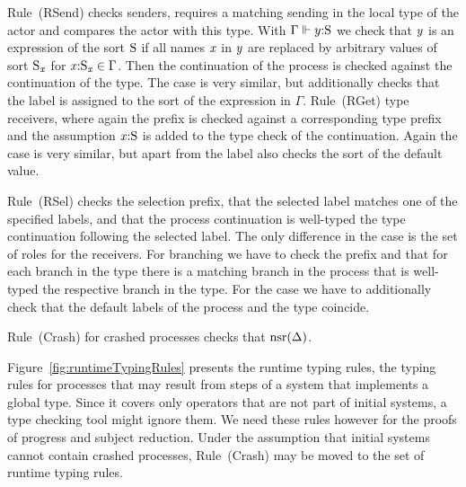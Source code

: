Rule~(\textsf{RSend}) checks \strongR senders, \ie requires a matching \strongR sending in the local type of the actor and compares the actor with this type.
With $ \Gamma \Vdash \Typed{\Expr[y]}{\Sort} $ we check that $ \Expr[y] $ is an expression of the sort $ \Sort $ if all names $ \Args $ in $ \Expr[y] $ are replaced by arbitrary values of sort $ \Sort_{\Args} $ for $ \Typed{\Args}{\Sort_{\Args}} \in \Gamma $.
Then the continuation of the process is checked against the continuation of the type.
The \unrel case is very similar, but additionally checks that the label is assigned to the sort of the expression in $ \Gamma $.
Rule~(\textsf{RGet}) type \strongR receivers, where again the prefix is checked against a corresponding type prefix and the assumption $ \Typed{\Args}{\Sort} $ is added to the type check of the continuation.
Again the \unrel case is very similar, but apart from the label also checks the sort of the default value.

Rule~(\textsf{RSel}) checks the \strongR selection prefix, that the selected label matches one of the specified labels, and that the process continuation is well-typed \wrt the type continuation following the selected label.
The only difference in the \weakR case is the set of roles for the receivers.
For \strongR branching we have to check the prefix and that for each branch in the type there is a matching branch in the process that is well-typed \wrt the respective branch in the type.
For the \weakR case we have to additionally check that the default labels of the process and the type coincide.

Rule~(\textsf{Crash}) for crashed processes checks that $ \Unreliable{\Delta} $.

Figure~\ref{fig:runtimeTypingRules} presents the runtime typing rules, \ie the typing rules for processes that may result from steps of a system that implements a global type.
Since it covers only operators that are not part of initial systems, a type checking tool might ignore them.
We need these rules however for the proofs of progress and subject reduction.
Under the assumption that initial systems cannot contain crashed processes, Rule~(\textsf{Crash}) may be moved to the set of runtime typing rules.

